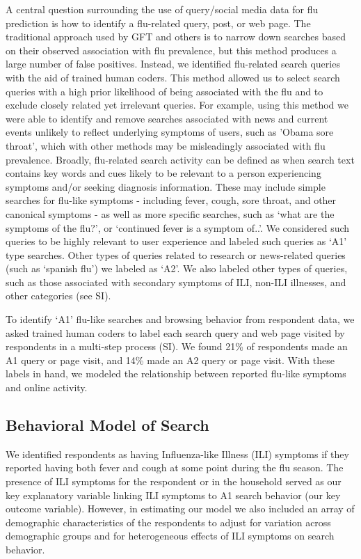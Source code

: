 \documentclass[fleqn,10pt]{wlscirep}
\begin{document}
A central question surrounding the use of query/social media data for flu prediction is how to identify a flu-related query, post, or web page. The traditional approach used by GFT and others is to narrow down searches based on their observed association with flu prevalence, but this method produces a large number of false positives. Instead, we identified flu-related search queries with the aid of trained human coders. This method allowed us to select search queries with a high prior likelihood of being associated with the flu and to exclude closely related yet irrelevant queries. For example, using this method we were able to identify and remove searches associated with news and current events unlikely to reflect underlying symptoms of users, such as 'Obama sore throat', which with other methods may be misleadingly associated with flu prevalence. 
Broadly, flu-related search activity can be defined as when search text contains key words and cues likely to be relevant to a person experiencing symptoms and/or seeking diagnosis information. These may include simple searches for flu-like symptoms - including fever, cough, sore throat, and other canonical symptoms - as well as more specific searches, such as `what are the symptoms of the flu?', or `continued fever is a symptom of..'. We considered such queries to be highly relevant to user experience and labeled such queries as `A1' type searches. Other types of queries related to research or news-related queries (such as `spanish flu') we labeled as `A2'. We also labeled other types of queries, such as those associated with secondary symptoms of ILI, non-ILI illnesses, and other categories (see SI). 

To identify `A1' flu-like searches and browsing behavior from respondent data, we asked trained human coders to label each search query and web page visited by respondents in a multi-step process (SI). We found 21\% of respondents made an A1 query or page visit, and 14\% made an A2 query or page visit. With these labels in hand, we modeled the relationship between reported flu-like symptoms and online activity.

\subsection*{Behavioral Model of Search}

We identified respondents as having Influenza-like Illness (ILI) symptoms if they reported having both fever and cough at some point during the flu season. The presence of ILI symptoms for the respondent or in the household served as our key explanatory variable linking ILI symptoms to A1 search behavior (our key outcome variable). However, in estimating our model we also included an array of demographic characteristics of the respondents to adjust for variation across demographic groups and for heterogeneous effects of ILI symptoms on search behavior.
\end{document}
